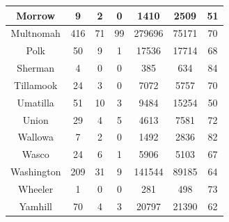 \documentclass[
  english,
  man]{apa6}
\begin{document}
\begin{table}
\begin{tabular}[t]{c|c|c|c|c|c|c}
\hline
Morrow & 9 & 2 & 0 & 1410 & 2509 & 51\\
\hline
Multnomah & 416 & 71 & 99 & 279696 & 75171 & 70\\
\hline
Polk & 50 & 9 & 1 & 17536 & 17714 & 68\\
\hline
Sherman & 4 & 0 & 0 & 385 & 634 & 84\\
\hline
Tillamook & 24 & 3 & 0 & 7072 & 5757 & 70\\
\hline
Umatilla & 51 & 10 & 3 & 9484 & 15254 & 50\\
\hline
Union & 29 & 4 & 5 & 4613 & 7581 & 72\\
\hline
Wallowa & 7 & 2 & 0 & 1492 & 2836 & 82\\
\hline
Wasco & 24 & 6 & 1 & 5906 & 5103 & 67\\
\hline
Washington & 209 & 31 & 9 & 141544 & 89185 & 64\\
\hline
Wheeler & 1 & 0 & 0 & 281 & 498 & 73\\
\hline
Yamhill & 70 & 4 & 3 & 20797 & 21390 & 62\\
\hline
\end{tabular}
\end{table}
\end{document}

